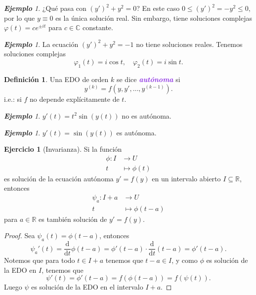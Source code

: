 \documentclass{article}
\theoremstyle{definition}
\newtheorem{definition}[theorem]{Definición}
\newtheorem{exercise}{Ejercicio}
\theoremstyle{remark}
\newtheorem{example}[theorem]{\textbf{Ejemplo}}
\numberwithin{equation}{section}
\newcommand{\C}{\mathbb{C}}
\newcommand{\R}{\mathbb{R}}
\renewcommand{\d}{\mathrm{d}}
\newcommand{\vphi}{\varphi}
\newcommand{\dv}[2]{\frac{\d#1}{\d#2}}
\newcommand{\wea}[1]{\textcolor{BlueViolet}{\textbf{\emph{#1}}}}
\begin{document}
\begin{example}
    ¿Qué pasa con $(y')^2 + y^2 = 0$? En este caso $0 \leq (y')^2 = - y^2 \leq 0$, por lo que $y \equiv 0$ es la única solución real. Sin embargo, tiene soluciones complejas $\vphi(t) = c e^{\pm it}$ para $c \in \C$ constante.
\end{example}

\begin{example}
    La ecuación $(y')^2 + y^2 = -1$ no tiene soluciones reales. Tenemos soluciones complejas
    \[ \vphi_1(t) = i \cos t, \quad \vphi_2(t) = i \sin{t}. \]
\end{example}

\begin{definition}
    Una EDO de orden $k$ se dice \wea{autónoma} si
    \[ y^{(k)} = f(y,y',\dots,y^{(k-1)}). \]
    i.e.: si $f$ no depende explícitamente de $t$.
\end{definition}

\begin{example}
    $y'(t) = t^2 \sin(y(t))$ no es autónoma.
\end{example}

\begin{example}
    $y'(t) = \sin(y(t))$ es autónoma.
\end{example}

\begin{exercise}
    [Invarianza]
    Si la función
    \begin{align*}
        \phi \colon I &\to U \\
        t &\mapsto \phi(t)
    \end{align*}
    es solución de la ecuación autónoma $y' = f(y)$ en un intervalo abierto $I \subseteq \R$, entonces
    \begin{align*}
        \psi_a \colon I + a &\to U \\
        t &\mapsto \phi(t-a)
    \end{align*}
    para $a \in \R$ es también solución de $y' = f(y)$.
\end{exercise}
\begin{proof}
    Sea $\psi_a(t) = \phi(t-a)$, entonces
    \[ \psi_a'(t) = \dv{}{t} \phi(t-a) = \phi'(t-a) \cdot \dv{}{t} (t-a) = \phi'(t-a). \]
    Notemos que para todo $t \in I+a$ tenemos que $t-a \in I$, y como $\phi$ es solución de la EDO en $I$, tenemos que
    \[ \psi'(t) = \phi'(t-a) = f(\phi(t-a)) = f(\psi(t)). \]
    Luego $\psi$ es solución de la EDO en el intervalo $I+a$.
\end{proof}
\end{document}

